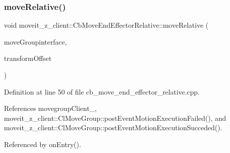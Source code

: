 \subsubsection{\texorpdfstring{move\+Relative()}{moveRelative()}}
{\footnotesize\ttfamily void moveit\+\_\+z\+\_\+client\+::\+Cb\+Move\+End\+Effector\+Relative\+::move\+Relative (\begin{DoxyParamCaption}\item[{moveit\+::planning\+\_\+interface\+::\+Move\+Group\+Interface \&}]{move\+Groupinterface,  }\item[{geometry\+\_\+msgs\+::\+Transform \&}]{transform\+Offset }\end{DoxyParamCaption})\hspace{0.3cm}{\ttfamily [protected]}}



Definition at line 50 of file cb\+\_\+move\+\_\+end\+\_\+effector\+\_\+relative.\+cpp.



References movegroup\+Client\+\_\+, moveit\+\_\+z\+\_\+client\+::\+Cl\+Move\+Group\+::post\+Event\+Motion\+Execution\+Failed(), and moveit\+\_\+z\+\_\+client\+::\+Cl\+Move\+Group\+::post\+Event\+Motion\+Execution\+Succeded().



Referenced by on\+Entry().


